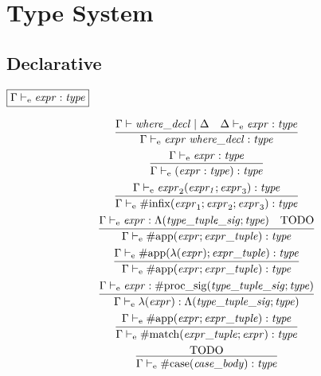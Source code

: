 \section{Type System}

\subsection{Declarative}

$\fbox{$\Gamma \vdash_\mathrm{e} \mathit{expr}: \mathit{type}$}$

\begin{gather*}
    \infer{\Gamma \vdash_\mathrm{e} \mathit{expr}\; \mathit{where\_decl}: \mathit{type}}{
        \Gamma \vdash \mathit{where\_decl} \mid \Delta
        &
        \Delta \vdash_\mathrm{e} \mathit{expr}: \mathit{type}
    }
    \\
    \infer{\Gamma \vdash_\mathrm{e} (\mathit{expr}: \mathit{type}): \mathit{type}}{
        \Gamma \vdash_\mathrm{e} \mathit{expr}: \mathit{type}
    }
    \\
    \infer{\Gamma \vdash_\mathrm{e} \mathrm{\#infix}(\mathit{expr}_1; \mathit{expr}_2; \mathit{expr}_3): \mathit{type}}{
        \Gamma \vdash_\mathrm{e} \mathit{expr}_2(\mathit{expr_1}; \mathit{expr}_3): \mathit{type}
    }
    \\
    \infer{\Gamma \vdash_\mathrm{e} \mathrm{\#app}(\mathit{expr}; \mathit{expr\_tuple}): \mathit{type}}{
        \Gamma \vdash_\mathrm{e} \mathit{expr}: \Lambda(\mathit{type\_tuple\_sig}; \mathit{type})
        &
        \text{TODO}
    }
    \\
    \infer{\Gamma \vdash_\mathrm{e} \mathrm{\#app}(\mathit{expr}; \mathit{expr\_tuple}): \mathit{type}}{
        \Gamma \vdash_\mathrm{e} \mathrm{\#app}(\lambda(\mathit{expr}); \mathit{expr\_tuple}): \mathit{type}
    }
    \\
    \infer{\Gamma \vdash_\mathrm{e} \lambda(\mathit{expr}): \Lambda(\mathit{type\_tuple\_sig}; \mathit{type})}{
        \Gamma \vdash_\mathrm{e} \mathit{expr}: \mathrm{\#proc\_sig}(\mathit{type\_tuple\_sig}; \mathit{type})
    }
    \\
    \infer{\Gamma \vdash_\mathrm{e} \mathrm{\#match}(\mathit{expr\_tuple}; \mathit{expr}): \mathit{type}}{
        \Gamma \vdash_\mathrm{e} \mathrm{\#app}(\mathit{expr}; \mathit{expr\_tuple}): \mathit{type}
    }
    \\
    \infer{\Gamma \vdash_\mathrm{e} \mathrm{\#case}(\mathit{case\_body}): \mathit{type}}{
        \text{TODO}
    }
    \\

\end{gather*}
